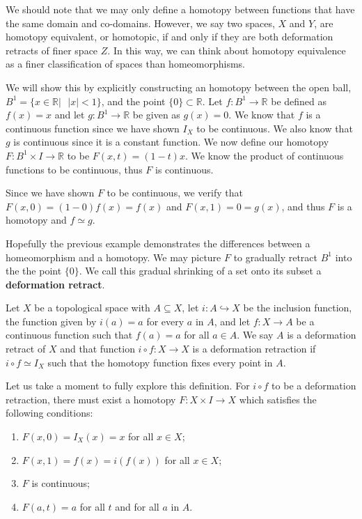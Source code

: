 \documentclass[12pt,oneside]{amsbook}
\newenvironment{defn}[1][Definition.]{\begin{trivlist}
\item[\hskip \labelsep {\bfseries #1}]}{\end{trivlist}}
\newcommand{\R}{\mathbb{R}}
\begin{document}
We should note that we may only define a homotopy between functions that have the same domain and co-domains. However, we say two spaces, $X$ and $Y$, are homotopy equivalent, or homotopic, if and only if they are both deformation retracts of finer space $Z$. In this way, we can think about homotopy equivalence as a finer classification of spaces than homeomorphisms. 

We will show this by explicitly constructing an homotopy between the open ball, $B^1 =\{x \in \R| \text{ }|x| <1\}$, and the point $\{0\}\subset \R$. Let $f\colon B^1 \rightarrow \R$ be defined as $f(x)=x$ and let $g\colon B^1 \rightarrow \R$ be given as $g(x)=0$. We know that $f$ is a continuous function since we have shown $I_X$ to be continuous. We also know that $g$ is continuous since it is a constant function. We now define our homotopy $F\colon B^1 \times I \rightarrow \R$ to be $F(x,t)= (1-t)x$. We know the product of continuous functions to be continuous, thus $F$ is continuous. 

Since we have shown $F$ to be continuous, we verify that $F(x,0)= (1-0)f(x) = f(x)$ and $F(x,1)= 0 =g(x)$, and thus $F$ is a homotopy and $f\simeq g$.  

Hopefully the previous example demonstrates the differences between a homeomorphism and a homotopy. We may picture $F$ to gradually retract $B^1$ into the the point $\{0\}$. We call this gradual shrinking of a set onto its subset a \textbf{deformation retract}.

\begin{defn}
Let $X$ be a topological space with $A\subseteq X$, let $i\colon A\hookrightarrow X$ be the inclusion function, the function given by $i(a)=a$ for every $a$ in $A$, and let $f\colon X\rightarrow A$ be a continuous function such that $f(a)= a$ for all $a\in A$. We say $A$ is a deformation retract of $X$ and that function $i\circ f\colon X\rightarrow X$ is a deformation retraction if $i\circ f \simeq I_X$ such that the homotopy function fixes every point in $A$.
\end{defn}

Let us take a moment to fully explore this definition. For $i \circ f$ to be a deformation retraction, there must exist a homotopy $F\colon X\times I \rightarrow X$ which satisfies the following conditions:
\begin{enumerate}
\item $F(x,0)=I_X(x)=x$ for all $x \in X$;

\item $F(x,1)=f(x)=i(f(x))$ for all $x\in X$;

\item $F$ is continuous;
\item $F(a,t)=a$ for all $t$ and for all $a$ in $A$.
\end{enumerate}
\end{document}
